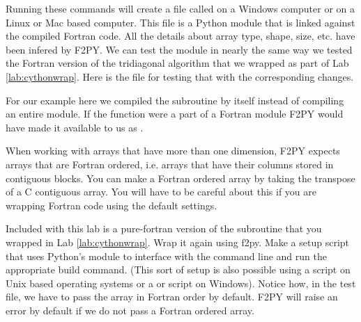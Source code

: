 Running these commands will create a file called  on a Windows computer or  on a Linux or Mac based computer.
This file is a Python module that is linked against the compiled Fortran code.
All the details about array type, shape, size, etc. have been infered by F2PY.
We can test the module in nearly the same way we tested the Fortran version of the tridiagonal algorithm that we wrapped as part of Lab \ref{lab:cythonwrap}.
Here is the file for testing that with the corresponding changes.

\begin{info}
For our example here we compiled the subroutine by itself instead of compiling an entire module.
If the function were a part of a Fortran module  F2PY would have made it available to us as .
\end{info}

\begin{warn}
When working with arrays that have more than one dimension, F2PY expects arrays that are Fortran ordered, i.e. arrays that have their columns stored in contiguous blocks.
You can make a Fortran ordered array by taking the transpose of a C contiguous array.
You will have to be careful about this if you are wrapping Fortran code using the default settings.
\end{warn}

\begin{problem}
Included with this lab is a pure-fortran version of the  subroutine that you wrapped in Lab \ref{lab:cythonwrap}.
Wrap it again using f2py.
Make a setup script that uses Python's  module to interface with the command line and run the appropriate build command.
(This sort of setup is also possible using a  script on Unix based operating systems or a  or  script on Windows).
Notice how, in the test file, we have to pass the array in Fortran order by default.
F2PY will raise an error by default if we do not pass a Fortran ordered array.
\end{problem}




